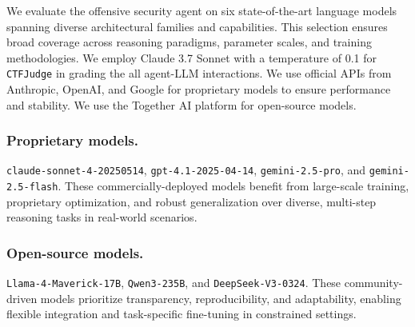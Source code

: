 We evaluate the offensive security agent on six state-of-the-art language models spanning diverse architectural families and capabilities. This selection ensures broad coverage across reasoning paradigms, parameter scales, and training methodologies. We employ Claude 3.7 Sonnet with a temperature of 0.1 for \texttt{CTFJudge} in grading the  all agent-LLM interactions. We use official APIs from Anthropic, OpenAI, and Google for proprietary models to ensure performance and stability. We use the Together AI platform for open-source models. %

\subsubsection{Proprietary models.} \texttt{claude-sonnet-4-20250514}, \texttt{gpt-4.1-2025-04-14}, \texttt{gemini-2.5-pro}, and \texttt{gemini-2.5-flash}. These commercially-deployed models benefit from large-scale training, proprietary optimization, and robust generalization over diverse, multi-step reasoning tasks in real-world scenarios.
 
\subsubsection{Open-source models.} \texttt{Llama-4-Maverick-17B}, \texttt{Qwen3-235B}, and \texttt{DeepSeek-V3-0324}. These community-driven models prioritize transparency, reproducibility, and adaptability, enabling flexible integration and task-specific fine-tuning in constrained settings.






